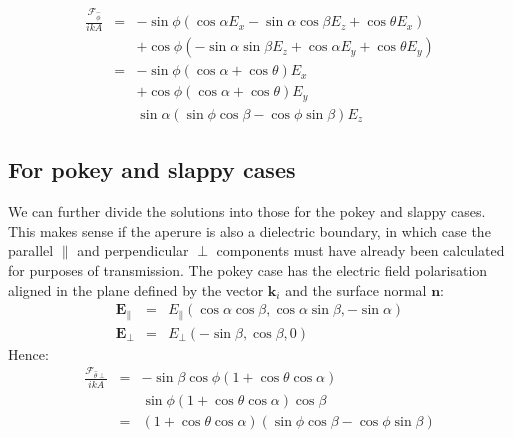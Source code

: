 \documentclass[a4article,12pt]{article}
\newcommand{\kvec}[0]{{\mathbf k}}
\newcommand{\Evec}[0]{{\mathbf E}}
\newcommand{\Fcal}[1]{{\mathcal F}_{#1}}
\newcommand{\nvec}[0]{{\mathbf n}}
\begin{document}
%
\begin{eqnarray}
\frac{\Fcal{\hat{\phi}}}{i k A} & = & -\sin \phi \left(\cos \alpha E_x - \sin \alpha \cos \beta E_z + \cos \theta E_x \right) \nonumber \\
&& + \cos \phi \left(  -\sin \alpha \sin \beta E_z + \cos \alpha E_y + \cos \theta E_y \right) \nonumber \\
& = & - \sin \phi  \left(\cos \alpha + \cos \theta \right) E_x \nonumber \\
&& + \cos \phi  \left(\cos \alpha + \cos \theta \right) E_y \nonumber \\
&& \sin \alpha \left( \sin \phi \cos \beta - \cos \phi \sin \beta \right) E_z
\end{eqnarray}

\subsection{For pokey and slappy cases}

We can further divide the solutions into those for the pokey and slappy cases. This makes sense if the aperure is also a dielectric boundary, in which case the parallel $\parallel$ and perpendicular $\perp$ components must have already been calculated for purposes of transmission. The pokey case has the electric field polarisation aligned in the plane defined by the vector $\kvec_i$ and the surface normal $\nvec$:
%
\begin{eqnarray}
\Evec_{\parallel} & = & E_{\parallel} \left( \cos \alpha \cos \beta, \cos \alpha \sin \beta, - \sin \alpha \right) \\
\Evec_{\perp} & = & E_{\perp} \left( -\sin \beta, \cos \beta, 0 \right) 
\end{eqnarray}
%
Hence:
%
\begin{eqnarray}
\frac{\Fcal{\hat{\theta} \perp}}{i k A} & = & -\sin \beta \cos \phi \left( 1 + \cos \theta \cos \alpha \right) \nonumber \\
&& \sin \phi \left( 1 + \cos \theta \cos \alpha \right) \cos \beta \nonumber \\
& = & \left( 1 + \cos \theta \cos \alpha \right) \left(\sin \phi \cos \beta - \cos \phi \sin \beta \right)
\end{eqnarray}
\end{document}
